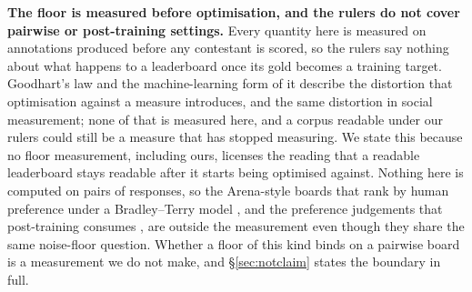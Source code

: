 \documentclass{article}
\begin{document}
\textbf{The floor is measured before optimisation, and the rulers do not cover pairwise or post-training settings.} Every quantity here is measured on annotations produced before any contestant is scored, so the rulers say nothing about what happens to a leaderboard once its gold becomes a training target. Goodhart's law and the machine-learning form of it \cite{goodhart1984,hennessygoodhart2023} describe the distortion that optimisation against a measure introduces, and \cite{campbell2011} the same distortion in social measurement; none of that is measured here, and a corpus readable under our rulers could still be a measure that has stopped measuring. We state this because no floor measurement, including ours, licenses the reading that a readable leaderboard stays readable after it starts being optimised against. Nothing here is computed on pairs of responses, so the Arena-style boards that rank by human preference under a Bradley--Terry model \cite{chiang2024chatbotarena,bradleyterry1952}, and the preference judgements that post-training consumes \cite{ouyang2022rlhf,rafailov2023dpo}, are outside the measurement even though they share the same noise-floor question. Whether a floor of this kind binds on a pairwise board is a measurement we do not make, and \S\ref{sec:notclaim} states the boundary in full.
\end{document}
